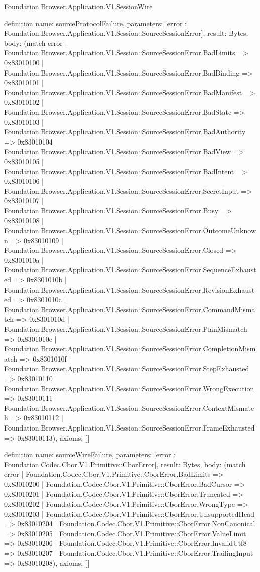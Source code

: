 \begin{lexlean}{Foundation.Browser.Application.V1.SessionWire}
\begin{semanticmodule}
definition{
  name: sourceProtocolFailure,
  parameters: [error : Foundation.Browser.Application.V1.Session::SourceSessionError],
  result: Bytes,
  body: (match error
    | Foundation.Browser.Application.V1.Session::SourceSessionError.BadLimits => 0x83010100
    | Foundation.Browser.Application.V1.Session::SourceSessionError.BadBinding => 0x83010101
    | Foundation.Browser.Application.V1.Session::SourceSessionError.BadManifest => 0x83010102
    | Foundation.Browser.Application.V1.Session::SourceSessionError.BadState => 0x83010103
    | Foundation.Browser.Application.V1.Session::SourceSessionError.BadAuthority => 0x83010104
    | Foundation.Browser.Application.V1.Session::SourceSessionError.BadView => 0x83010105
    | Foundation.Browser.Application.V1.Session::SourceSessionError.BadIntent => 0x83010106
    | Foundation.Browser.Application.V1.Session::SourceSessionError.SecretInput => 0x83010107
    | Foundation.Browser.Application.V1.Session::SourceSessionError.Busy => 0x83010108
    | Foundation.Browser.Application.V1.Session::SourceSessionError.OutcomeUnknown => 0x83010109
    | Foundation.Browser.Application.V1.Session::SourceSessionError.Closed => 0x8301010a
    | Foundation.Browser.Application.V1.Session::SourceSessionError.SequenceExhausted => 0x8301010b
    | Foundation.Browser.Application.V1.Session::SourceSessionError.RevisionExhausted => 0x8301010c
    | Foundation.Browser.Application.V1.Session::SourceSessionError.CommandMismatch => 0x8301010d
    | Foundation.Browser.Application.V1.Session::SourceSessionError.PlanMismatch => 0x8301010e
    | Foundation.Browser.Application.V1.Session::SourceSessionError.CompletionMismatch => 0x8301010f
    | Foundation.Browser.Application.V1.Session::SourceSessionError.StepExhausted => 0x83010110
    | Foundation.Browser.Application.V1.Session::SourceSessionError.WrongExecution => 0x83010111
    | Foundation.Browser.Application.V1.Session::SourceSessionError.ContextMismatch => 0x83010112
    | Foundation.Browser.Application.V1.Session::SourceSessionError.FrameExhausted => 0x83010113),
  axioms: []
}

definition{
  name: sourceWireFailure,
  parameters: [error : Foundation.Codec.Cbor.V1.Primitive::CborError],
  result: Bytes,
  body: (match error
    | Foundation.Codec.Cbor.V1.Primitive::CborError.BadLimits => 0x83010200
    | Foundation.Codec.Cbor.V1.Primitive::CborError.BadCursor => 0x83010201
    | Foundation.Codec.Cbor.V1.Primitive::CborError.Truncated => 0x83010202
    | Foundation.Codec.Cbor.V1.Primitive::CborError.WrongType => 0x83010203
    | Foundation.Codec.Cbor.V1.Primitive::CborError.UnsupportedHead => 0x83010204
    | Foundation.Codec.Cbor.V1.Primitive::CborError.NonCanonical => 0x83010205
    | Foundation.Codec.Cbor.V1.Primitive::CborError.ValueLimit => 0x83010206
    | Foundation.Codec.Cbor.V1.Primitive::CborError.InvalidUtf8 => 0x83010207
    | Foundation.Codec.Cbor.V1.Primitive::CborError.TrailingInput => 0x83010208),
  axioms: []
}


\end{semanticmodule}
\end{lexlean}
